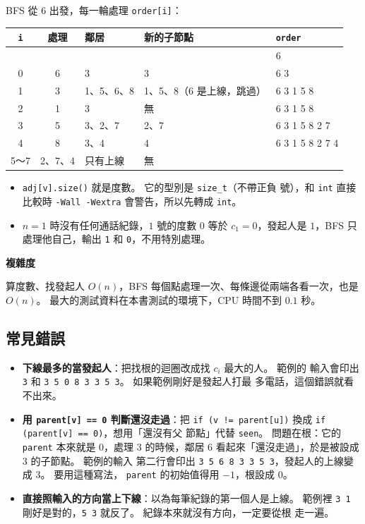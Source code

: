 BFS 從 $6$ 出發，每一輪處理 \texttt{order[i]}：

\begin{center}
\begin{tabular}{cclll}
\toprule
\texttt{i} & 處理 & 鄰居 & 新的子節點 & \texttt{order} \\
\midrule
 & & & & 6 \\
0 & 6 & 3 & 3 & 6 3 \\
1 & 3 & 1、5、6、8 & 1、5、8（6 是上線，跳過）& 6 3 1 5 8 \\
2 & 1 & 3 & 無 & 6 3 1 5 8 \\
3 & 5 & 3、2、7 & 2、7 & 6 3 1 5 8 2 7 \\
4 & 8 & 3、4 & 4 & 6 3 1 5 8 2 7 4 \\
5～7 & 2、7、4 & 只有上線 & 無 & \\
\bottomrule
\end{tabular}
\end{center}

\begin{itemize}
\item \texttt{adj[v].size()} 就是度數。 它的型別是 \texttt{size\_t}（不帶正負
號），和 \texttt{int} 直接比較時 \texttt{-Wall -Wextra} 會警告，所以先轉成
\texttt{int}。
\item $n = 1$ 時沒有任何通話紀錄，$1$ 號的度數 $0$ 等於 $c_1 = 0$，發起人是
$1$，BFS 只處理他自己，輸出 \texttt{1} 和 \texttt{0}，不用特別處理。
\end{itemize}

\textbf{複雜度}

算度數、找發起人 $O(n)$，BFS 每個點處理一次、每條邊從兩端各看一次，也是
$O(n)$。 最大的測試資料在本書測試的環境下，CPU 時間不到 $0.1$ 秒。

\subsection{常見錯誤}

\begin{itemize}
\item \textbf{下線最多的當發起人}：把找根的迴圈改成找 $c_i$ 最大的人。 範例的
輸入會印出 \texttt{3} 和 \texttt{3 5 0 8 3 3 5 3}。 如果範例剛好是發起人打最
多電話，這個錯誤就看不出來。
\item \textbf{用 \texttt{parent[v] == 0} 判斷還沒走過}：把
\texttt{if (v != parent[u])} 換成 \texttt{if (parent[v] == 0)}，想用「還沒有父
節點」代替 \texttt{seen}。 問題在根：它的 \texttt{parent} 本來就是 $0$，處理
$3$ 的時候，鄰居 $6$ 看起來「還沒走過」，於是被設成 $3$ 的子節點。 範例的輸入
第二行會印出 \texttt{3 5 6 8 3 3 5 3}，發起人的上線變成 $3$。 要用這種寫法，
\texttt{parent} 的初始值得用 $-1$，根設成 $0$。
\item \textbf{直接照輸入的方向當上下線}：以為每筆紀錄的第一個人是上線。 範例裡
\texttt{3 1} 剛好是對的，\texttt{5 3} 就反了。 紀錄本來就沒有方向，一定要從根
走一遍。
\end{itemize}

